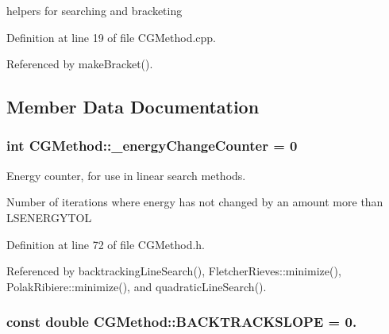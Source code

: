 helpers for searching and bracketing 



Definition at line 19 of file C\+G\+Method.\+cpp.



Referenced by make\+Bracket().



\subsection{Member Data Documentation}
\hypertarget{classCGMethod_aadb778c988685e46d7d109350973d826}{
\subsubsection[{\+\_\+energy\+Change\+Counter}]{\setlength{\rightskip}{0pt plus 5cm}int C\+G\+Method\+::\+\_\+energy\+Change\+Counter = 0\hspace{0.3cm}{\ttfamily [protected]}}}\label{classCGMethod_aadb778c988685e46d7d109350973d826}


Energy counter, for use in linear search methods. 

Number of iterations where energy has not changed by an amount more than L\+S\+E\+N\+E\+R\+G\+Y\+T\+O\+L 

Definition at line 72 of file C\+G\+Method.\+h.



Referenced by backtracking\+Line\+Search(), Fletcher\+Rieves\+::minimize(), Polak\+Ribiere\+::minimize(), and quadratic\+Line\+Search().

\hypertarget{classCGMethod_aa7a8cad90cb1961052e323ded645b4c2}{
\subsubsection[{B\+A\+C\+K\+T\+R\+A\+C\+K\+S\+L\+O\+P\+E}]{\setlength{\rightskip}{0pt plus 5cm}const double C\+G\+Method\+::\+B\+A\+C\+K\+T\+R\+A\+C\+K\+S\+L\+O\+P\+E = 0.\hspace{0.3cm}{\ttfamily [protected]}}}\label{classCGMethod_aa7a8cad90cb1961052e323ded645b4c2}


